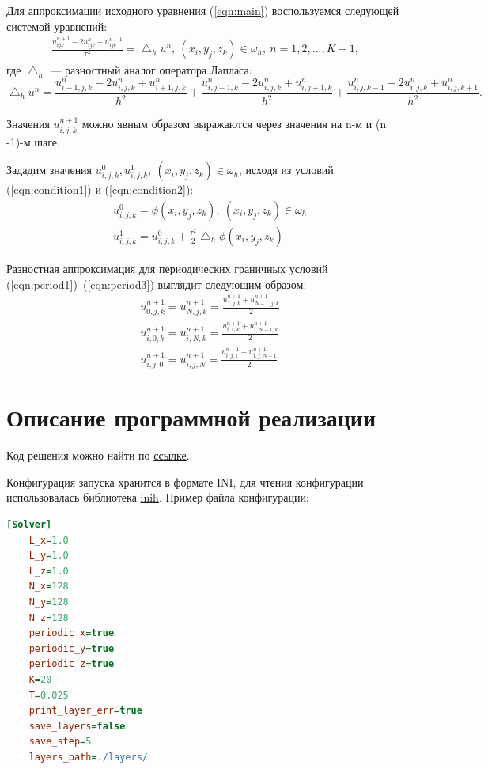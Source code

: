 \documentclass[oneside, final, 12pt]{extarticle}
\begin{document}
Для аппроксимации исходного уравнения (\ref{eqn:main}) воспользуемся следующей системой уравнений:
\begin{align}
\frac{u_{ijk}^{n + 1} - 2u_{ijk}^{n} + u_{ijk}^{n - 1} }{\tau ^ 2} = \bigtriangleup_h u^n, \: (x_i, y_j, z_k) \in \omega_h, \: n = 1, 2, ..., K - 1, \label{eqn:approx}
\end{align}
где $ \bigtriangleup_h $ --- разностный аналог оператора Лапласа:
$$
\bigtriangleup_h u^n = \frac{u^n_{i - 1, j, k} - 2u^n_{i, j, k} + u^n_{i + 1, j, k}}{h^2} + 
\frac{u^n_{i, j - 1, k} - 2u^n_{i, j, k} + u^n_{i, j + 1, k}}{h^2} + 
\frac{u^n_{i, j, k - 1} - 2u^n_{i, j, k} + u^n_{i, j, k + 1}}{h^2}.
$$

Значения $u^{n + 1}_{i,j,k}$ можно явным образом выражаются через значения на n-м и (n -1)-м шаге. 

Зададим значения $ u_{i, j, k}^{0}, u_{i, j, k}^{1}, \: (x_i, y_j, z_k) \in \omega_h $, исходя из условий (\ref{eqn:condition1}) и (\ref{eqn:condition2}):
\begin{align}
& u^0_{i,j,k} = \phi(x_i, y_j, z_k), \: (x_i, y_j, z_k) \in \omega_h \\
& u^1_{i,j,k} = u^0_{i,j,k} + \frac{\tau ^ 2}{2}  \bigtriangleup_h \phi(x_i, y_j, z_k) \label{eqn:u1}
\end{align}

Разностная аппроксимация для периодических граничных условий (\ref{eqn:period1})--(\ref{eqn:period3}) выглядит следующим образом:
\begin{align*}
& u^{n + 1}_{0,j,k} = u^{n + 1}_{N,j,k} = \frac{u^{n + 1}_{1,j,k} + u^{n + 1}_{N - 1,j,k}}{2} \\
& u^{n + 1}_{i,0,k} = u^{n + 1}_{i,N,k} = \frac{u^{n + 1}_{i,1,k} + u^{n + 1}_{i,N - 1,k}}{2} \\
& u^{n + 1}_{i,j,0} = u^{n + 1}_{i,j,N} = \frac{u^{n + 1}_{i,j,1} + u^{n + 1}_{i,j,N - 1}}{2}
\end{align*}

\section{Описание программной реализации}

Код решения можно найти по \href{https://github.com/shorohml/SuperComp/tree/master/task3}{ссылке}.

Конфигурация запуска хранится в формате INI, для чтения конфигурации использовалась библиотека \href{https://github.com/jtilly/inih}{inih}.
Пример файла конфигурации:
\begin{lstlisting}[language={INI}]
[Solver]
    L_x=1.0
    L_y=1.0
    L_z=1.0
    N_x=128
    N_y=128
    N_z=128
    periodic_x=true
    periodic_y=true
    periodic_z=true
    K=20
    T=0.025
    print_layer_err=true
    save_layers=false
    save_step=5
    layers_path=./layers/    
\end{lstlisting}
\end{document}
